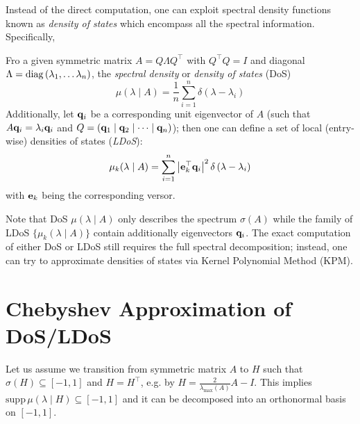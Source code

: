 \documentclass{mynotes}
\begin{document}
Instead of the direct computation, one can exploit spectral density functions known as \emph{density of states} which encompass all the spectral information. Specifically,

\begin{definition}
      Fro a given symmetric matrix \( A = Q \Lambda Q^\top \) with \( Q^\top Q = I \) and diagonal \( \Lambda = \operatorname{diag} \left( \lambda_1, \dots \lambda_{n} \right) \), the \emph{spectral density} or \emph{density of states} (DoS)
      \begin{equation}
            \mu( \lambda \mid A ) = \frac{1}{n} \sum_{i=1}^{n} \delta \left( \lambda - \lambda_i \right)
      \end{equation}
      Additionally, let \( \mathbf{q}_i \) be a corresponding unit eigenvector of \( A \) (such that \( A \mathbf{q}_i = \lambda_i \mathbf{q}_i \) and \( Q = \left( \mathbf{q}_1 \mid \mathbf{q}_2 \mid \dots \mid \mathbf{q}_n \right)\)); then one can define a set of local (entry-wise) densities of states (\emph{LDoS}):
      \begin{equation}
            \mu_k ( \lambda \mid A ) = \sum_{i=1}^{n} \left| \mathbf{e}_k^\top \mathbf{q}_i \right|^2 \delta \left( \lambda - \lambda_i \right)
      \end{equation}
      with \( \mathbf{e}_k \) being the corresponding versor. 
\end{definition}

Note that DoS \( \mu ( \lambda \mid A ) \) only describes the spectrum \( \sigma ( A ) \) while the family of LDoS \( \{ \mu_k (\lambda \mid A ) \} \) contain additionally eigenvectors \( \mathbf{q}_i \). The exact computation of either DoS or LDoS still requires the full spectral decomposition; instead, one can try to approximate densities of states via Kernel Polynomial Method (KPM).%

\section{ Chebyshev Approximation of DoS/LDoS }

Let us assume we transition from symmetric matrix \( A \) to  \( H \) such that \( \sigma(H) \subseteq [-1, 1 ]\) and \( H = H^\top \), e.g. by \( H = \frac{2}{ \lambda_{\max{}} ( A ) } A - I \). This implies \( \mathrm{supp}\, \mu( \lambda \mid H ) \subseteq [-1, 1]\) and it can be decomposed into an orthonormal basis on \( [-1, 1]\). 
\end{document}

